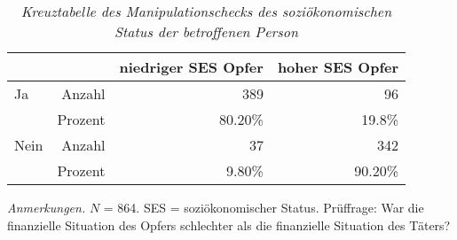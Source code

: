 \begin{table}[htb]
    \caption[Kreuztabelle Manipulationscheck soziökonomischer Status des Opfers]{\textit {Kreuztabelle des Manipulationschecks des soziökonomischen Status der betroffenen Person}} 
    \label{KT_SES}
    \centering
    \begin{adjustbox}{width=\textwidth}
    \small
    \begin{tabular}{lrrr}
      \hline
        &   & niedriger SES Opfer & hoher SES Opfer \\
      \hline
    Ja   & Anzahl  & 389      & 96      \\
         & Prozent & 80.20\%  & 19.8\%  \\
    Nein & Anzahl  & 37       & 342     \\
         & Prozent & 9.80\%   & 90.20\% \\
       \hline
    \end{tabular}
    \end{adjustbox}
    
    \begin{tablenotes}
        \item \textit{Anmerkungen.} \( N \) = 864. SES = soziökonomischer Status. Prüffrage: War die finanzielle Situation des Opfers schlechter als die finanzielle Situation des Täters?
      \end{tablenotes}
    \end{table}